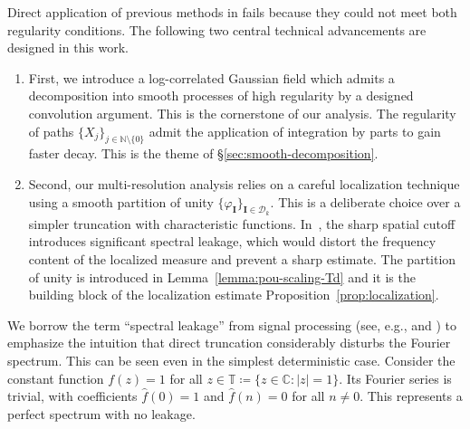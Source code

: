 \documentclass[12pt]{amsart}
\theoremstyle{definition}
\theoremstyle{remark}
\newcommand{\C}{\mathbb{C}}
\numberwithin{equation}{section}
\begin{document}
Direct application of previous methods in \cite{LQT25} fails because they could not meet both regularity conditions. The following two central technical advancements are designed in this work.
\begin{enumerate}
	\item First, we introduce a log-correlated Gaussian field which admits a decomposition into smooth processes of high regularity by a designed convolution argument. This is the cornerstone of our analysis. The regularity of paths $\{X_j\}_{j\in \mathbb{N}\setminus \{0\}}$ admit the application of integration by parts to gain faster decay. This is the theme of \S\ref{sec:smooth-decomposition}.
	\item Second, our multi-resolution analysis relies on a careful localization technique using a smooth partition of unity $\{\varphi_{\boldsymbol{I}}\}_{\boldsymbol{I}\in \mathscr{D}_k}$. This is a deliberate choice over a simpler truncation with characteristic functions. In~\cite{LQT25}, the sharp spatial cutoff introduces significant spectral leakage, which would distort the frequency content of the localized measure and prevent a sharp estimate. The partition of unity is introduced in Lemma~\ref{lemma:pou-scaling-Td} and it is the building block of the localization estimate Proposition~\ref{prop:localization}. 
\end{enumerate}

We borrow the term ``spectral leakage'' from signal processing (see, e.g., \cite[Example~10.3]{OS10} and \cite{Har78}) to emphasize the intuition that direct truncation considerably disturbs the Fourier spectrum. This can be seen even in the simplest deterministic case. Consider the constant function $f(z) = 1$ for all $z \in \mathbb{T}\coloneq\{z\in \C:|z|=1\}$. Its Fourier series is trivial, with coefficients $\widehat{f}(0) = 1$ and $\widehat{f}(n) = 0$ for all $n \neq 0$. This represents a perfect spectrum with no leakage.
\end{document}
